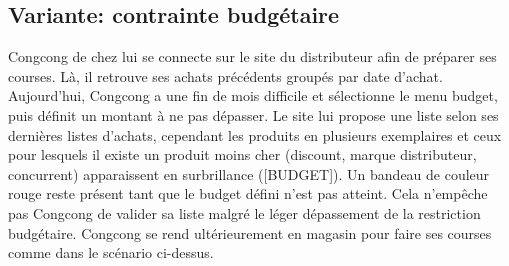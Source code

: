 \subsection{Variante: contrainte budgétaire}
Congcong de chez lui se connecte sur le site du distributeur afin de préparer ses courses.
Là, il retrouve ses achats précédents groupés par date d'achat.
Aujourd'hui, Congcong a une fin de mois difficile et sélectionne le menu budget, puis définit un montant à ne pas dépasser.
Le site lui propose une liste selon ses dernières listes d'achats, cependant les produits en plusieurs exemplaires et ceux pour lesquels il existe un produit moins cher (discount, marque distributeur, concurrent) apparaissent en surbrillance ([BUDGET]).
Un bandeau de couleur rouge reste présent tant que le budget défini n'est pas atteint.
Cela n'empêche pas Congcong de valider sa liste malgré le léger dépassement de la restriction budgétaire.
Congcong se rend ultérieurement en magasin pour faire ses courses comme dans le scénario ci-dessus.
